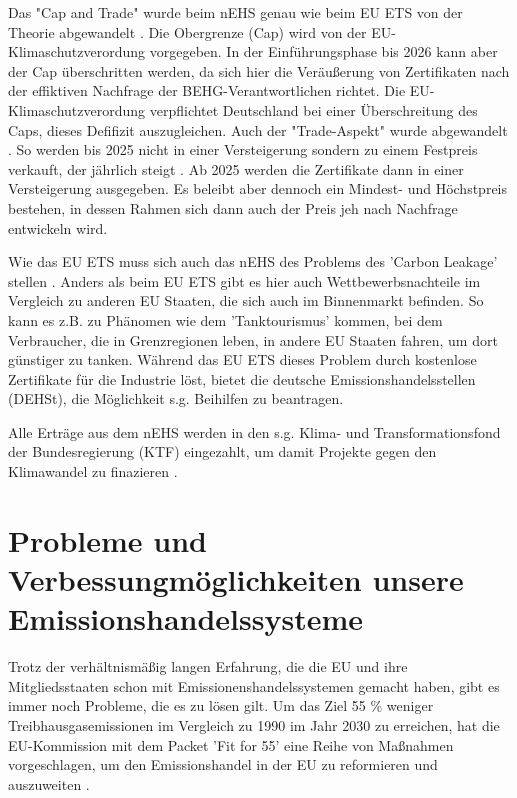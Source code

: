 Das "Cap and Trade" wurde beim nEHS genau wie beim EU ETS von der Theorie abgewandelt \cite{dehst.2023}. Die Obergrenze (Cap) wird von der EU-Klimaschutzverordung vorgegeben. 
In der Einführungsphase bis 2026 kann aber der Cap überschritten werden, da sich hier die Veräußerung von Zertifikaten nach der effiktiven Nachfrage der BEHG-Verantwortlichen richtet.
Die EU-Klimaschutzverordung verpflichtet Deutschland bei einer Überschreitung des Caps, dieses Defifizit auszugleichen. Auch der "Trade-Aspekt" wurde abgewandelt \cite{dehst.2023}. 
So werden bis 2025 nicht in einer Versteigerung sondern zu einem Festpreis verkauft, der jährlich steigt . 
Ab 2025 werden die Zertifikate dann in einer Versteigerung ausgegeben. 
Es beleibt aber dennoch ein Mindest- und Höchstpreis bestehen, in dessen Rahmen sich dann auch der Preis jeh nach Nachfrage entwickeln wird.

Wie das EU ETS muss sich auch das nEHS des Problems des 'Carbon Leakage' stellen \cite{dehst2.2023}. Anders als beim EU ETS gibt es hier auch Wettbewerbsnachteile im Vergleich zu anderen EU Staaten, die sich auch im Binnenmarkt befinden. 
So kann es z.B. zu Phänomen wie dem 'Tanktourismus' kommen, bei dem Verbraucher, die in Grenzregionen leben, in andere EU Staaten fahren, um dort günstiger zu tanken. 
Während das EU ETS dieses Problem durch kostenlose Zertifikate für die Industrie löst, bietet die deutsche Emissionshandelsstellen (DEHSt), die Möglichkeit s.g. Beihilfen zu beantragen.

Alle Erträge aus dem nEHS werden in den s.g. Klima- und Transformationsfond der Bundesregierung (KTF) eingezahlt, um damit Projekte gegen den Klimawandel zu finazieren \cite{dehst.2023}.

\section{Probleme und Verbessungmöglichkeiten unsere Emissionshandelssysteme}

Trotz der verhältnismäßig langen Erfahrung, die die EU und ihre Mitgliedsstaaten schon mit Emissionenshandelssystemen gemacht haben, gibt es immer noch Probleme, die es zu lösen gilt.
Um das Ziel 55 \% weniger Treibhausgasemissionen im Vergleich zu 1990 im Jahr 2030 zu erreichen, hat die EU-Kommission mit dem Packet 'Fit for 55' eine Reihe von Maßnahmen vorgeschlagen, um den Emissionshandel in der EU zu reformieren und auszuweiten \cite{ub.2023}.

